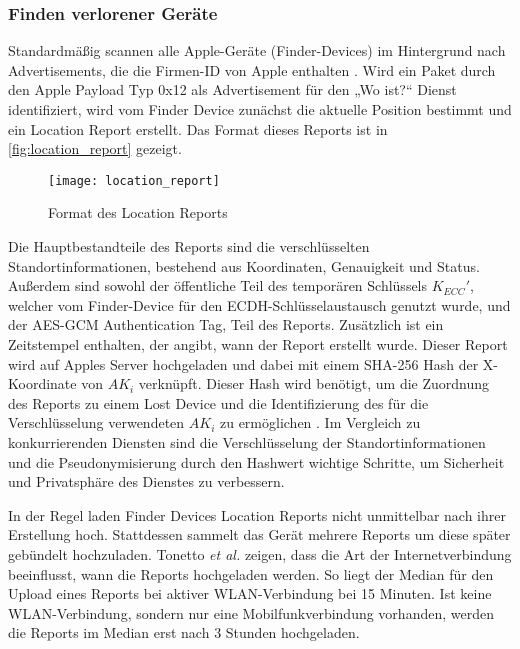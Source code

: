 \subsubsection{Finden verlorener Geräte}
\label{sec:finden}
Standardmäßig scannen alle Apple-Geräte (Finder-Devices) im Hintergrund nach Advertisements, die die Firmen-ID von Apple enthalten \cite{Heinrich_FindMy,Martin_continuity}.
Wird ein Paket durch den Apple Payload Typ 0x12 als Advertisement für den „Wo ist?“ Dienst identifiziert, wird vom Finder Device zunächst die aktuelle Position bestimmt und ein Location Report erstellt.
Das Format dieses Reports ist in \autoref{fig:location_report} gezeigt.
\begin{figure}[ht]
    \centering
    \texttt{[image: location\_report]}
    \caption{Format des Location Reports \cite{Heinrich_FindMy}}
    \label{fig:location_report}
\end{figure}
Die Hauptbestandteile des Reports sind die verschlüsselten Standortinformationen, bestehend aus Koordinaten, Genauigkeit und Status.
Außerdem sind sowohl der öffentliche Teil des temporären Schlüssels $K_{ECC}'$, welcher vom Finder-Device für den \ac{ECDH}-Schlüsselaustausch genutzt wurde, und der \ac{AES}-\ac{GCM} Authentication Tag, Teil des Reports.
Zusätzlich ist ein Zeitstempel enthalten, der angibt, wann der Report erstellt wurde.
Dieser Report wird auf Apples Server hochgeladen und dabei mit einem \ac{SHA}-256 Hash der X-Koordinate von $AK_i$ verknüpft.
Dieser Hash wird benötigt, um die Zuordnung des Reports zu einem Lost Device und die Identifizierung des für die Verschlüsselung verwendeten $AK_i$ zu ermöglichen \cite{Heinrich_FindMy}.
Im Vergleich zu konkurrierenden Diensten sind die Verschlüsselung der Standortinformationen und die Pseudonymisierung durch den Hashwert wichtige Schritte, um Sicherheit und Privatsphäre des Dienstes zu verbessern.

In der Regel laden Finder Devices Location Reports nicht unmittelbar nach ihrer Erstellung hoch.
Stattdessen sammelt das Gerät mehrere Reports um diese später gebündelt hochzuladen.
Tonetto \textit{et al.} \cite{Tonetto_FindMy} zeigen, dass die Art der Internetverbindung beeinflusst, wann die Reports hochgeladen werden.
So liegt der Median für den Upload eines Reports bei aktiver WLAN-Verbindung bei 15 Minuten.
Ist keine WLAN-Verbindung, sondern nur eine Mobilfunkverbindung vorhanden, werden die Reports im Median erst nach 3 Stunden hochgeladen.


